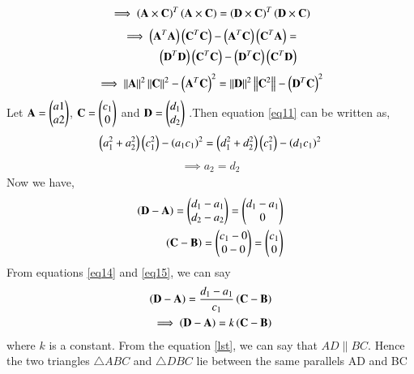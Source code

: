 \documentclass[journal,12pt,twocolumn]{IEEEtran}
\begin{document}
\begin{align}
    \implies\left(\mathbf{A}\times\mathbf{C}\right)^T \left(\mathbf{A}\times\mathbf{C}\right) = \left(\mathbf{D}\times\mathbf{C}\right)^T \left(\mathbf{D}\times\mathbf{C}\right)
\end{align}
\begin{equation}
\begin{align}
    \implies \left(\mathbf{A}^T\mathbf{A}\right)\left(\mathbf{C}^T\mathbf{C}\right) - \left(\mathbf{A}^T\mathbf{C}\right)\left(\mathbf{C}^T\mathbf{A}\right) =\\ \left(\mathbf{D}^T\mathbf{D}\right)\left(\mathbf{C}^T\mathbf{C}\right) - \left(\mathbf{D}^T\mathbf{C}\right)\left(\mathbf{C}^T\mathbf{D}\right)
\end{align}
\end{equation}
\begin{align}
    \label{eq11}
    \implies\left\lVert\mathbf{A}\right\rVert^2\left\lVert\mathbf{C}\right\rVert^2 - \left(\mathbf{A}^T\mathbf{C}\right)^2 = \left\lVert\mathbf{D}\right\rVert^2\left\lVert\mathbf{C}^2\right\rVert - \left(\mathbf{D}^T\mathbf{C}\right)^2 
\end{align}
Let $\mathbf{A}=\begin{pmatrix}a1\\a2\end{pmatrix}$, $\mathbf{C}=\begin{pmatrix}c_1\\0\end{pmatrix}$ and $\mathbf{D}=\begin{pmatrix}d_1\\d_2\end{pmatrix}$ .Then equation \eqref{eq11} can be written as,
\begin{align}
    \label{lbo}
    \left(a_1^2+a_2^2\right)\left(c_1^2\right)-\left(a_1c_1\right)^2 = \left(d_1^2+d_2^2\right)\left(c_1^2\right) - \left(d_1c_1\right)^2
\end{align}
\begin{align}
    \implies a_2 = d_2
\end{align}
Now we have,
\begin{align}
    \label{eq14}
    \left(\mathbf{D}-\mathbf{A}\right)=\begin{pmatrix}d_1-a_1\\d_2-a_2\end{pmatrix} = \begin{pmatrix}d_1-a_1\\0\end{pmatrix}\\ 
    \label{eq15}
    \left(\mathbf{C}-\mathbf{B}\right) = \begin{pmatrix}c_1-0 \\ 0-0\end{pmatrix} = \begin{pmatrix}c_1 \\ 0\end{pmatrix}
\end{align}
From equations \eqref{eq14} and \eqref{eq15}, we can say
\begin{align}
    \left(\mathbf{D}-\mathbf{A}\right)=\frac{d_1-a_1}{c_1}\left(\mathbf{C}-\mathbf{B}\right)\\
    \label{lst}
    \implies \left(\mathbf{D}-\mathbf{A}\right)=k\left(\mathbf{C}-\mathbf{B}\right)
\end{align}
where $k$ is a constant. From the equation \eqref{lst}, we can say that $AD \parallel BC$. Hence the two triangles $\triangle ABC$ and $\triangle DBC$ lie between the same parallels AD and BC
\end{document}
